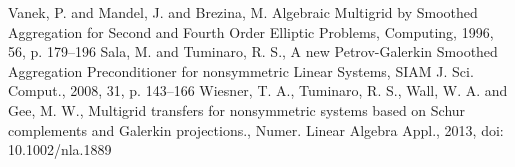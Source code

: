 \documentclass[12pt,a4paper]{article}
\begin{document}
\begin{thebibliography}{9}
 Vanek, P. and Mandel, J. and Brezina, M. Algebraic Multigrid by Smoothed Aggregation for Second and Fourth Order Elliptic Problems, Computing, 1996, 56, p. 179--196
 Sala, M. and Tuminaro, R. S., A new Petrov-Galerkin Smoothed Aggregation Preconditioner for nonsymmetric Linear Systems, SIAM J. Sci. Comput., 2008, 31, p. 143--166
 Wiesner, T. A., Tuminaro, R. S., Wall, W. A. and Gee, M. W., Multigrid transfers for nonsymmetric systems based on Schur complements and Galerkin projections., Numer. Linear Algebra Appl., 2013, doi: 10.1002/nla.1889
\end{thebibliography}
\end{document}
